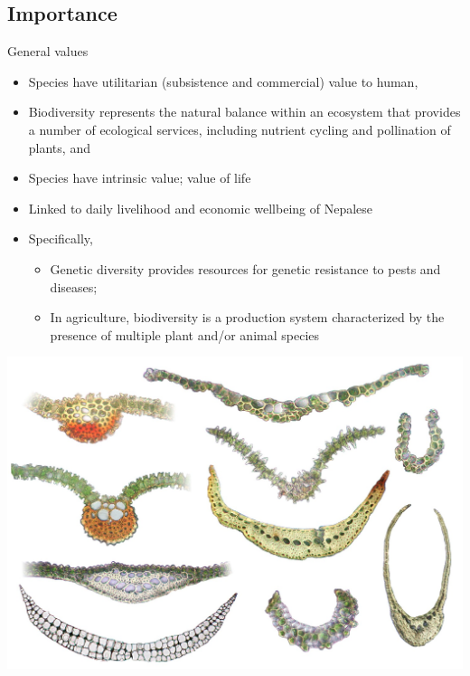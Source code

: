 \documentclass[
  ignorenonframetext,
  aspectratio=169]{beamer}
\providecommand{\tightlist}{%
  \setlength{\itemsep}{0pt}\setlength{\parskip}{0pt}}
\begin{document}
\hypertarget{importance}{%
\subsection{Importance}\label{importance}}

\begin{frame}{General values}
\protect\hypertarget{general-values}{}
\begin{itemize}
\tightlist
\item
  Species have utilitarian (subsistence and commercial) value to human,
\item
  Biodiversity represents the natural balance within an ecosystem that
  provides a number of ecological services, including nutrient cycling
  and pollination of plants, and
\item
  Species have intrinsic value; value of life
\item
  Linked to daily livelihood and economic wellbeing of Nepalese
\item
  Specifically,

  \begin{itemize}
  \tightlist
  \item
    Genetic diversity provides resources for genetic resistance to pests
    and diseases;
  \item
    In agriculture, biodiversity is a production system characterized by
    the presence of multiple plant and/or animal species
  \end{itemize}
\end{itemize}
\end{frame}

\begin{frame}{}
\protect\hypertarget{section-10}{}
\begin{center}\includegraphics[width=0.85\linewidth]{../images/fungal_fruiting_body_necklace} \end{center}
\end{frame}
\end{document}
